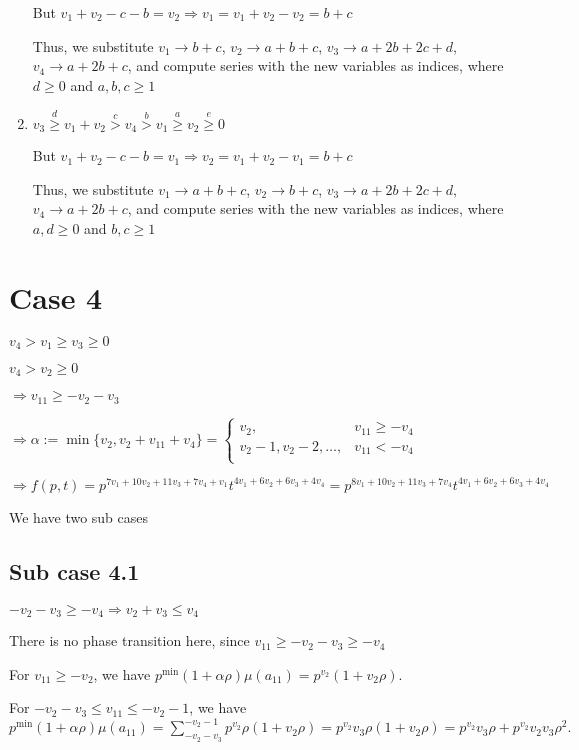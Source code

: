 \documentclass{article}
\begin{document}
\begin{enumerate}
But $v_1+v_2-c-b=v_2\Rightarrow{v_1=v_1+v_2-v_2=b+c}$

Thus, we substitute 
$v_1\rightarrow{b+c}$, 
$v_2\rightarrow{a+b+c}$, 
$v_3\rightarrow{a+2b+2c+d}$, 
$v_4\rightarrow{a+2b+c}$, and compute series with the new variables as indices, where $d\geq{0}$ and $a,b,c\geq{1}$
\item 
$v_3\overset{d}{\geq}v_1+v_2\overset{c}{>}v_4\overset{b}{>}{v_1}\overset{a}{\geq}v_2\overset{e}{\geq}{0}$

But $v_1+v_2-c-b=v_1\Rightarrow{v_2=v_1+v_2-v_1=b+c}$

Thus, we substitute 
$v_1\rightarrow{a+b+c}$, 
$v_2\rightarrow{b+c}$, 
$v_3\rightarrow{a+2b+2c+d}$, 
$v_4\rightarrow{a+2b+c}$, and compute series with the new variables as indices, where $a,d\geq{0}$ and $b,c\geq{1}$

\end{enumerate}

\section{Case 4}
$v_4>v_1\geq{v_3}\geq{0}$

$v_4>v_2\geq{0}$

$\Rightarrow{v_{11}}\geq{-v_2-v_3}$

$\Rightarrow\alpha:=\min\{v_2,v_2+v_{11}+v_4\}=\begin{cases}
       v_2, & v_{11}\geq{-v_4}\\
       v_2-1,v_2-2,\dots, & v_{11}<{-v_4}\\
     \end{cases}$

     $\Rightarrow{f(p,t)=p^{7v_1+10v_2+11v_3+7v_4+v_1}t^{4v_1+6v_2+6v_3+4v_4}=p^{8v_1+10v_2+11v_3+7v_4}t^{4v_1+6v_2+6v_3+4v_4}}$

We have two sub cases

\subsection{Sub case 4.1}
$-v_2-v_3\geq{-v_4}\Rightarrow{v_2+v_3\leq{v_4}}$

There is no phase transition here, since $v_{11}\geq{-v_2-v_3}\geq{-v_4}$

For $v_{11}\geq{-v_2}$, we have $p^{\min}(1+\alpha\rho)\mu(a_{11})=p^{v_2}(1+v_2\rho).$

For $-v_2-v_3\leq{v_{11}}\leq{-v_2-1}$, we have $p^{\min}(1+\alpha\rho)\mu(a_{11})=\sum_{-v_2-v_3}^{-v_2-1}p^{v_2}\rho(1+v_2\rho)=p^{v_2}v_3\rho(1+v_2\rho)=p^{v_2}v_3\rho+p^{v_2}v_2v_3\rho^2.$
\end{document}
